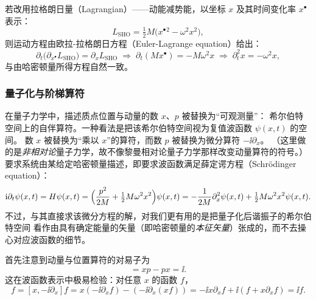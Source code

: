 若改用拉格朗日量（Lagrangian）——动能减势能，以坐标 $x$ 及其时间变化率 $x^{\bullet}$ 表示：
\begin{equation}
L_{\text{SHO}}=\tfrac12 M\bigl(x^{\bullet}{}^{2}-\omega^{2}x^{2}\bigr),
\tag{Lagrangian}
\end{equation}
则运动方程由欧拉-拉格朗日方程（Euler-Lagrange equation）给出：
\begin{equation*}
\partial_{t}\bigl(\partial_{x^{\bullet}}L_{\text{SHO}}\bigr)=\partial_{x}L_{\text{SHO}}
\;\Longrightarrow\;
\partial_{t}(M x^{\bullet})=-M\omega^{2}x
\;\Longrightarrow\;
\partial_{t}^{2}x=-\omega^{2}x,
\end{equation*}
与由哈密顿量所得方程自然一致。

\subsubsection*{量子化与阶梯算符}

在量子力学中，描述质点位置与动量的数 $x$、$p$ 被替换为“可观测量”：
希尔伯特空间上的自伴算符。一种看法是把该希尔伯特空间视为复值波函数 $\psi(x,t)$ 的空间。
数 $x$ 被替换为“乘以 $x$”的算符，而数 $p$ 被替换为微分算符 $-\ii\partial_{x}$。
（这里做的是\emph{非相对论}量子力学，故不像黎曼相对论量子力学那样改变动量算符的符号。）
要求系统由某给定哈密顿量描述，即要求波函数满足薛定谔方程（Schrödinger equation）：
\begin{equation*}
\mathrm{i}\partial_{t}\psi(x,t)=H\psi(x,t)
=\Bigl(\frac{p^{2}}{2M}+\tfrac12 M\omega^{2}x^{2}\Bigr)\psi(x,t)
=-\frac{1}{2M}\partial_{x}^{2}\psi(x,t)+\tfrac12 M\omega^{2}x^{2}\psi(x,t).
\end{equation*}
不过，与其直接求该微分方程的解，对我们更有用的是把量子化后谐振子的希尔伯特空间
看作由具有确定能量的矢量（即哈密顿量的\emph{本征矢量}）张成的，而不去操心对应波函数的细节。

首先注意到动量与位置算符的对易子为
\begin{equation}
[x,p]=xp-px=\ii .
\tag{commutator}
\end{equation}
这在波函数表示中极易检验：对任意 $x$ 的函数 $f$，
\begin{equation*}
[x,p]f=[x,-\ii\partial_{x}]f
=x(-\ii\partial_{x}f)-(-\ii\partial_{x}(xf))
=-\ii x\partial_{x}f+\ii(f+x\partial_{x}f)=\ii f .
\end{equation*}

